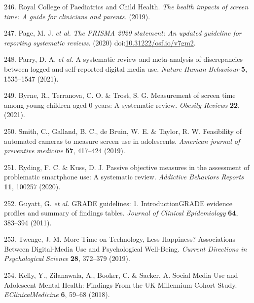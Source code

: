 \documentclass[
  english,
  man]{apa6}
\newenvironment{cslreferences}%
  {}%
  {\par}
\begin{document}
\begin{cslreferences}
\leavevmode\hypertarget{ref-royalcollegeofpaediatricsandchildhealthHealthImpactsScreen2019}{}%
246. Royal College of Paediatrics and Child Health. \emph{The health impacts of screen time: A guide for clinicians and parents.} (2019).

\leavevmode\hypertarget{ref-pagePRISMA2020Statement2020}{}%
247. Page, M. J. \emph{et al.} \emph{The PRISMA 2020 statement: An updated guideline for reporting systematic reviews}. (2020) doi:\href{https://doi.org/10.31222/osf.io/v7gm2}{10.31222/osf.io/v7gm2}.

\leavevmode\hypertarget{ref-parrySystematicReviewMetaanalysis2021}{}%
248. Parry, D. A. \emph{et al.} A systematic review and meta-analysis of discrepancies between logged and self-reported digital media use. \emph{Nature Human Behaviour} \textbf{5}, 1535--1547 (2021).

\leavevmode\hypertarget{ref-byrneMeasurementScreenTime2021}{}%
249. Byrne, R., Terranova, C. O. \& Trost, S. G. Measurement of screen time among young children aged 0 years: A systematic review. \emph{Obesity Reviews} \textbf{22}, (2021).

\leavevmode\hypertarget{ref-smithFeasibilityAutomatedCameras2019}{}%
250. Smith, C., Galland, B. C., de Bruin, W. E. \& Taylor, R. W. Feasibility of automated cameras to measure screen use in adolescents. \emph{American journal of preventive medicine} \textbf{57}, 417--424 (2019).

\leavevmode\hypertarget{ref-rydingPassiveObjectiveMeasures2020}{}%
251. Ryding, F. C. \& Kuss, D. J. Passive objective measures in the assessment of problematic smartphone use: A systematic review. \emph{Addictive Behaviors Reports} \textbf{11}, 100257 (2020).

\leavevmode\hypertarget{ref-guyattGRADEGuidelinesIntroduction2011}{}%
252. Guyatt, G. \emph{et al.} GRADE guidelines: 1. IntroductionGRADE evidence profiles and summary of findings tables. \emph{Journal of Clinical Epidemiology} \textbf{64}, 383--394 (2011).

\leavevmode\hypertarget{ref-twengeMoreTimeTechnology2019}{}%
253. Twenge, J. M. More Time on Technology, Less Happiness? Associations Between Digital-Media Use and Psychological Well-Being. \emph{Current Directions in Psychological Science} \textbf{28}, 372--379 (2019).

\leavevmode\hypertarget{ref-kellySocialMediaUse2018}{}%
254. Kelly, Y., Zilanawala, A., Booker, C. \& Sacker, A. Social Media Use and Adolescent Mental Health: Findings From the UK Millennium Cohort Study. \emph{EClinicalMedicine} \textbf{6}, 59--68 (2018).


\end{cslreferences}
\end{document}
